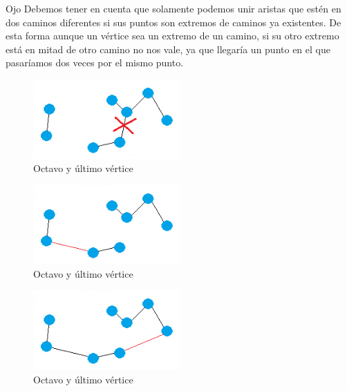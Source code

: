 \begin{frame}
	\begin{alertblock}{Ojo} 
	Debemos tener en cuenta que solamente podemos unir aristas que estén en dos caminos 
	diferentes si sus puntos son extremos de caminos ya existentes. De esta forma aunque 
	un vértice sea un extremo de un camino, si su otro extremo está en mitad de otro 
	camino no nos vale, ya que llegaría un punto en el que pasaríamos dos veces por el 
	mismo punto.
	\end{alertblock}
\end{frame}

\begin{frame}
	\begin{exampleblock}{ }
	\begin{figure}[htbH] 
		\centering
		\includegraphics[width=0.5\textwidth]{./Imagenes/arista6fail.png}
		\caption{Octavo y último vértice} 
	\end{figure}
	\end{exampleblock}
\end{frame}		
	

\begin{frame}
	\begin{exampleblock}{ } 
	\begin{figure}[htbH] 
		\centering
		\includegraphics[width=0.5\textwidth]{./Imagenes/arista7.png}
		\caption{Octavo y último vértice} 
	\end{figure}
	\end{exampleblock}
\end{frame}


\begin{frame}
	\begin{exampleblock}{ } 
	\begin{figure}[htbH] 
		\centering
		\includegraphics[width=0.5\textwidth]{./Imagenes/arista8.png}
		\caption{Octavo y último vértice} 
	\end{figure}
	\end{exampleblock}
\end{frame}

